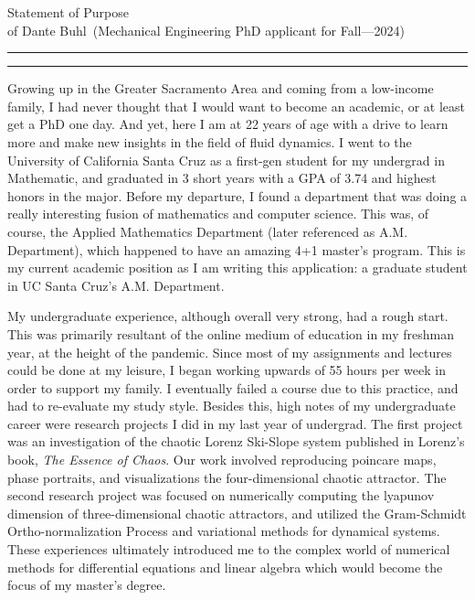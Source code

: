 \documentclass{article}
\newcommand{\soptitle}{Statement of Purpose}
\newcommand{\yourname}{Dante Buhl}
\begin{document}
\begin{center}\LARGE\soptitle\\
\large of \yourname\ (Mechanical Engineering PhD applicant for Fall---2024)
\end{center}

\hrule
\vspace{1pt}
\hrule height 1pt

\bigskip

\large
Growing up in the Greater Sacramento Area and coming from a low-income family, I had never thought that I would want to become an academic, or at least get a PhD one day. And yet, here I am at 22 years of age with a drive to learn more and make new insights in the field of fluid dynamics. I went to the University of California Santa Cruz as a first-gen student for my undergrad in Mathematic, and graduated in 3 short years with a GPA of 3.74 and highest honors in the major. Before my departure, I found a department that was doing a really interesting fusion of mathematics and computer science. This was, of course, the Applied Mathematics Department (later referenced as A.M. Department), which happened to have an amazing 4+1 master's program. This is my current academic position as I am writing this application: a graduate student in UC Santa Cruz's A.M. Department. 

My undergraduate experience, although overall very strong, had a rough start. This was primarily resultant of the online medium of education in my freshman year, at the height of the pandemic. Since most of my assignments and lectures could be done at my leisure, I began working upwards of 55 hours per week in order to support my family. I eventually failed a course due to this practice, and had to re-evaluate my study style. Besides this, high notes of my undergraduate career were research projects I did in my last year of undergrad. The first project was an investigation of the chaotic Lorenz Ski-Slope system published in Lorenz's book, \textit{The Essence of Chaos}. Our work involved reproducing poincare maps, phase portraits, and visualizations the four-dimensional chaotic attractor. The second research project was focused on numerically computing the lyapunov dimension of three-dimensional chaotic attractors, and utilized the Gram-Schmidt Ortho-normalization Process and variational methods for dynamical systems. These experiences ultimately introduced me to the complex world of numerical methods for differential equations and linear algebra which would become the focus of my master's degree. 
\end{document}
